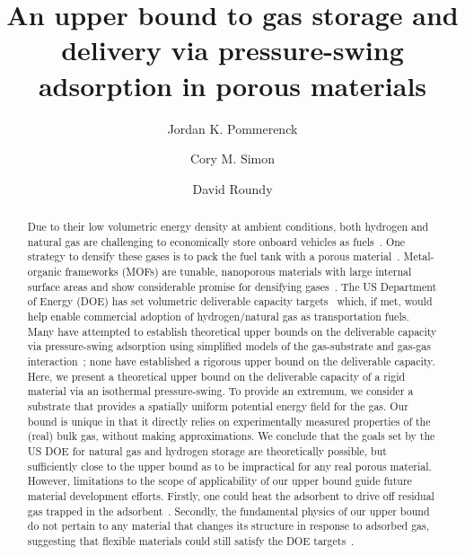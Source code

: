 \documentclass[letterpaper,twocolumn,amsmath,amssymb,nature]{revtex4-1}
\begin{document}
\title{
An upper bound to gas storage and delivery via pressure-swing adsorption in
porous materials}

\author{Jordan K. Pommerenck}
\author{Cory M. Simon}
\author{David Roundy}

\begin{abstract}
Due to their low volumetric energy density at ambient conditions, both hydrogen
and natural gas are challenging to economically store onboard vehicles as
fuels~\cite{mason2014evaluating, sircar2002pressure}. One strategy to densify
these gases is to pack the fuel tank with a porous
material~\cite{schoedel2016role}. Metal-organic frameworks (MOFs) are tunable,
nanoporous materials with large internal surface areas and show considerable
promise for densifying gases~\cite{makal2012methane,mason2014evaluating,
suh2011hydrogen,garcia2018benchmark, schoedel2016role}. The US Department of
Energy (DOE) has set volumetric deliverable capacity
targets~\cite{simon2015materials, h2targetsDOE} which, if met, would help
enable commercial adoption of hydrogen/natural gas as transportation fuels.
Many have attempted to establish theoretical upper bounds on the deliverable
capacity via pressure-swing adsorption using simplified models of the
gas-substrate and gas-gas interaction~\cite{gomez2014exploring,
gomez2017impact, kaija2018high, lee2019predicting}; none have established a
rigorous upper bound on the deliverable capacity. Here, we present a
theoretical upper bound on the deliverable capacity of a rigid material via an
isothermal pressure-swing. To provide an extremum, we consider a substrate that
provides a spatially uniform potential energy field for the gas. Our bound is
unique in that it directly relies on experimentally measured properties of the
(real) bulk gas, without making approximations. We conclude that the goals set
by the US DOE for natural gas and hydrogen storage are theoretically possible,
but sufficiently close to the upper bound as to be impractical for any real
porous material. However, limitations to the scope of applicability of our
upper bound guide future material development efforts. Firstly, one could heat
the adsorbent to drive off residual gas trapped in the
adsorbent~\cite{gomez2014exploring}. Secondly, the fundamental physics of our
upper bound do not pertain to any material that changes its structure in
response to adsorbed gas, suggesting that flexible materials could still
satisfy the DOE targets~\cite{schneemann2014flexible, choi2008broadly,
mason2015methane}.

\end{abstract}
\end{document}
